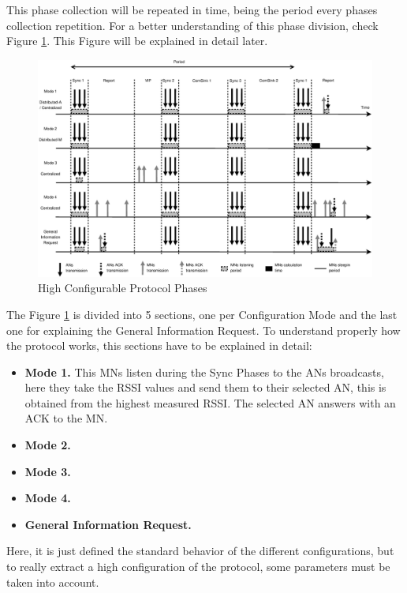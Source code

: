 This phase collection will be repeated in time, being the period every phases collection repetition. For a better understanding of this 
phase division, check Figure \ref{fig:ProtocolPhases}. This Figure will be explained in detail later.

\begin{figure}[ht]
 \begin{center}
  \includegraphics[width=1\textwidth]{ProtocolPhases.eps}
 \end{center}
 \caption{High Configurable Protocol Phases \cite{mipaper}}
 \label{fig:ProtocolPhases}
\end{figure}

The Figure \ref{fig:ProtocolPhases} is divided into 5 sections, one per Configuration Mode and the last one for explaining the General Information
Request. To understand properly how the protocol works, this sections have to be explained in detail:

\begin{itemize}
 \item \textbf{Mode 1.} This \acp{MN} listen during the Sync Phases to the \acp{AN} broadcasts, here they take the \ac{RSSI} values and send them
to their selected \ac{AN}, this is obtained from the highest measured \ac{RSSI}. The selected \ac{AN} answers with an \ac{ACK} to the \ac{MN}.
 \item \textbf{Mode 2.} 
 \item \textbf{Mode 3.} 
 \item \textbf{Mode 4.} 
 \item \textbf{General Information Request.} 
\end{itemize}

Here, it is just defined the standard behavior of the different configurations, but to really extract a high configuration of the protocol, some 
parameters must be taken into account.

